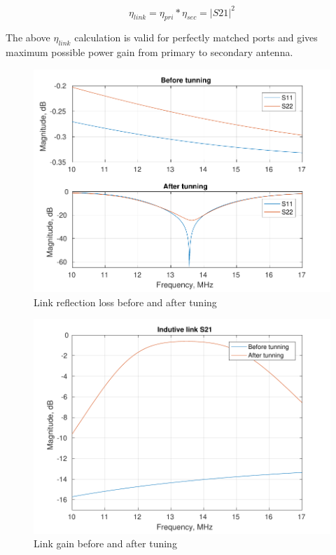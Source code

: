 \documentclass[12pt,a4paper,UKenglish]{report}
\begin{document}
\begin{equation} \label{eq:effi_link_s21}	%
\eta_{link} = \eta_{pri}*\eta_{sec} = |S21|^{2}
\end{equation} 

The above $\eta_{link}$ calculation is valid for perfectly matched ports and gives maximum possible power gain from primary to secondary antenna. \\

\begin{figure} [H]
  \centering
  \includegraphics[width=1\textwidth]{img/ant_s1_s2_both.pdf} 
 \caption{Link reflection loss before and after tuning} 
\label{fig:ant_S_loss} 
\end{figure}

\begin{figure} [!htb]
  \centering
  \includegraphics[width=1\textwidth]{img/ant_s21_both.pdf}
 \caption{Link gain before and after tuning} 
\label{fig:ant_S_gain} 
\end{figure}
\end{document}
